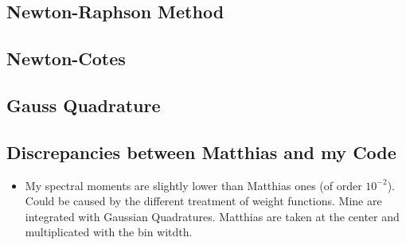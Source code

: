 \subsection{Newton-Raphson Method}
\subsection{Newton-Cotes}
\subsection{Gauss Quadrature}

\subsection{Discrepancies between Matthias and my Code}
\begin{itemize}
	\item My spectral moments are slightly lower than Matthias ones (of order $10^{-2}$). Could be caused by the different treatment of weight functions. Mine are integrated with Gaussian Quadratures. Matthias are taken at the center and multiplicated with the bin witdth.
\end{itemize}

